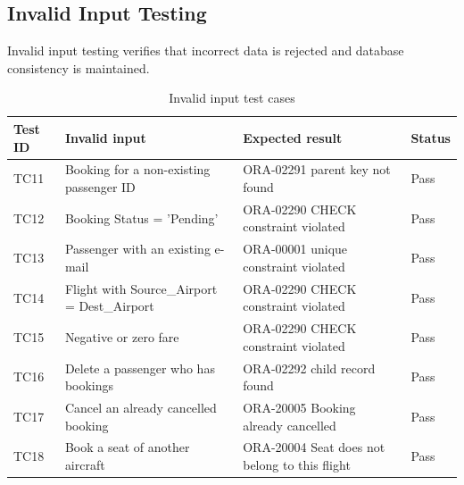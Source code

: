 \documentclass[12pt,a4paper]{article}
\begin{document}
\subsection{Invalid Input Testing}
Invalid input testing verifies that incorrect data is rejected and database consistency is maintained.
\begin{table}[H]
\centering\small
\begin{tabularx}{\textwidth}{l X X l}
\toprule
\textbf{Test ID} & \textbf{Invalid input} & \textbf{Expected result} & \textbf{Status}\\
\midrule
TC11 & Booking for a non-existing passenger ID & ORA-02291 parent key not found & Pass\\
TC12 & Booking Status = 'Pending' & ORA-02290 CHECK constraint violated & Pass\\
TC13 & Passenger with an existing e-mail & ORA-00001 unique constraint violated & Pass\\
TC14 & Flight with Source_Airport = Dest_Airport & ORA-02290 CHECK constraint violated & Pass\\
TC15 & Negative or zero fare & ORA-02290 CHECK constraint violated & Pass\\
TC16 & Delete a passenger who has bookings & ORA-02292 child record found & Pass\\
TC17 & Cancel an already cancelled booking & ORA-20005 Booking already cancelled & Pass\\
TC18 & Book a seat of another aircraft & ORA-20004 Seat does not belong to this flight & Pass\\
\bottomrule
\end{tabularx}
\caption{Invalid input test cases}
\end{table}
\end{document}
